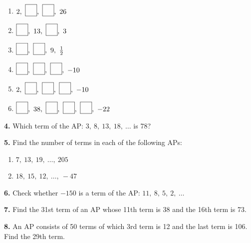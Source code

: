 \documentclass[12pt]{article}
\begin{document}
\begin{enumerate}[label=(\alph*)]
    \item \( 2,\ \fbox{\rule{0pt}{1em}\hspace{1em}},\ \fbox{\rule{0pt}{1em}\hspace{1em}},\ 26 \)
    \item \( \fbox{\rule{0pt}{1em}\hspace{1em}},\ 13,\ \fbox{\rule{0pt}{1em}\hspace{1em}},\ 3 \)
    \item \( \fbox{\rule{0pt}{1em}\hspace{1em}},\ \fbox{\rule{0pt}{1em}\hspace{1em}},\ 9,\ \frac{1}{2} \)
    \item \( \fbox{\rule{0pt}{1em}\hspace{1em}},\ \fbox{\rule{0pt}{1em}\hspace{1em}},\ \fbox{\rule{0pt}{1em}\hspace{1em}},\ -10 \)
    \item \( 2,\ \fbox{\rule{0pt}{1em}\hspace{1em}},\ \fbox{\rule{0pt}{1em}\hspace{1em}},\ \fbox{\rule{0pt}{1em}\hspace{1em}},\ -10 \)
    \item \( \fbox{\rule{0pt}{1em}\hspace{1em}},\ 38,\ \fbox{\rule{0pt}{1em}\hspace{1em}},\ \fbox{\rule{0pt}{1em}\hspace{1em}},\ \fbox{\rule{0pt}{1em}\hspace{1em}},\ -22 \)
\end{enumerate}


\textbf{4.} Which term of the AP: \( 3,\ 8,\ 13,\ 18,\ \ldots \) is 78?

\textbf{5.} Find the number of terms in each of the following APs:

\begin{enumerate}[label=(\alph*)]
    \item \( 7,\ 13,\ 19,\ \ldots,\ 205 \)
    \item \( 18,\ 15,\ 12,\ \ldots,\ -47 \)
\end{enumerate}

\textbf{6.} Check whether $-150$ is a term of the AP: $11,\ 8,\ 5,\ 2,\ \ldots$

\textbf{7.} Find the 31st term of an AP whose 11th term is 38 and the 16th term is 73.

\textbf{8.} An AP consists of 50 terms of which 3rd term is 12 and the last term is 106. Find the 29th term.
\end{document}

